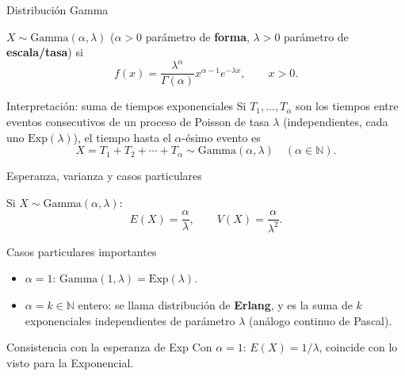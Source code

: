 \documentclass[aspectratio=169,11pt]{beamer}
\begin{document}
\begin{frame}{Distribución Gamma}
\begin{definition}
$X\sim\text{Gamma}(\alpha,\lambda)$ ($\alpha>0$ parámetro de \textbf{forma}, $\lambda>0$ parámetro de \textbf{escala/tasa}) si
$$f(x) = \frac{\lambda^\alpha}{\Gamma(\alpha)}x^{\alpha-1}e^{-\lambda x}, \qquad x> 0.$$
\end{definition}

\begin{block}{Interpretación: suma de tiempos exponenciales}
Si $T_1,\dots,T_\alpha$ son los tiempos entre eventos consecutivos de un proceso de Poisson de tasa $\lambda$ (independientes, cada uno $\text{Exp}(\lambda)$), el tiempo hasta el $\alpha$-ésimo evento es
$$X = T_1+T_2+\cdots+T_\alpha \sim \text{Gamma}(\alpha,\lambda) \quad (\alpha \in \mathbb{N}).$$
\end{block}
\end{frame}

\begin{frame}{Esperanza, varianza y casos particulares}
\begin{theorem}
Si $X\sim\text{Gamma}(\alpha,\lambda)$:
$$E(X) = \frac{\alpha}{\lambda}, \qquad V(X) = \frac{\alpha}{\lambda^2}.$$
\end{theorem}

\begin{alertblock}{Casos particulares importantes}
\begin{itemize}
\item $\alpha=1$: $\text{Gamma}(1,\lambda) = \text{Exp}(\lambda)$.
\item $\alpha=k\in\mathbb{N}$ entero: se llama distribución de \textbf{Erlang}, y es la suma de $k$ exponenciales independientes de parámetro $\lambda$ (análogo continuo de Pascal).
\end{itemize}
\end{alertblock}

\begin{block}{Consistencia con la esperanza de Exp}
Con $\alpha=1$: $E(X) = 1/\lambda$, coincide con lo visto para la Exponencial.
\end{block}
\end{frame}
\end{document}

